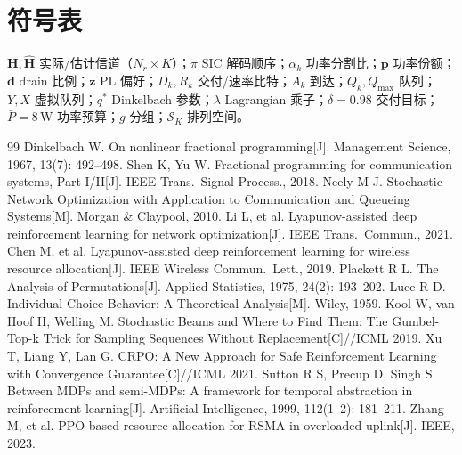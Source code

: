 \documentclass[UTF8,11pt,a4paper]{ctexart}
\theoremstyle{plain}
\theoremstyle{definition}
\theoremstyle{remark}
\newcommand{\vect}[1]{\mathbf{#1}}
\begin{document}
\section{符号表} \label{sec:symbols}

$\vect H,\hat{\vect{H}}$ 实际/估计信道（$N_r\times K$）；$\pi$ SIC 解码顺序；$\alpha_k$ 功率分割比；$\vect p$ 功率份额；$\vect d$ drain 比例；$\vect z$ PL 偏好；$D_k,R_k$ 交付/速率比特；$A_k$ 到达；$Q_k,Q_{\max}$ 队列；$Y,X$ 虚拟队列；$q^*$ Dinkelbach 参数；$\lambda$ Lagrangian 乘子；$\delta=0.98$ 交付目标；$\bar P=8$\,W 功率预算；$g$ 分组；$\mathcal S_K$ 排列空间。

\begin{thebibliography}{99}
   Dinkelbach W. On nonlinear fractional programming[J]. Management Science, 1967, 13(7): 492--498.
   Shen K, Yu W. Fractional programming for communication systems, Part I/II[J]. IEEE Trans.\ Signal Process., 2018.
   Neely M J. Stochastic Network Optimization with Application to Communication and Queueing Systems[M]. Morgan \& Claypool, 2010.
   Li L, et al. Lyapunov-assisted deep reinforcement learning for network optimization[J]. IEEE Trans.\ Commun., 2021.
   Chen M, et al. Lyapunov-assisted deep reinforcement learning for wireless resource allocation[J]. IEEE Wireless Commun.\ Lett., 2019.
   Plackett R L. The Analysis of Permutations[J]. Applied Statistics, 1975, 24(2): 193--202.
   Luce R D. Individual Choice Behavior: A Theoretical Analysis[M]. Wiley, 1959.
   Kool W, van Hoof H, Welling M. Stochastic Beams and Where to Find Them: The Gumbel-Top-k Trick for Sampling Sequences Without Replacement[C]//ICML 2019.
   Xu T, Liang Y, Lan G. CRPO: A New Approach for Safe Reinforcement Learning with Convergence Guarantee[C]//ICML 2021.
   Sutton R S, Precup D, Singh S. Between MDPs and semi-MDPs: A framework for temporal abstraction in reinforcement learning[J]. Artificial Intelligence, 1999, 112(1--2): 181--211.
   Zhang M, et al. PPO-based resource allocation for RSMA in overloaded uplink[J]. IEEE, 2023.
\end{thebibliography}
\end{document}
